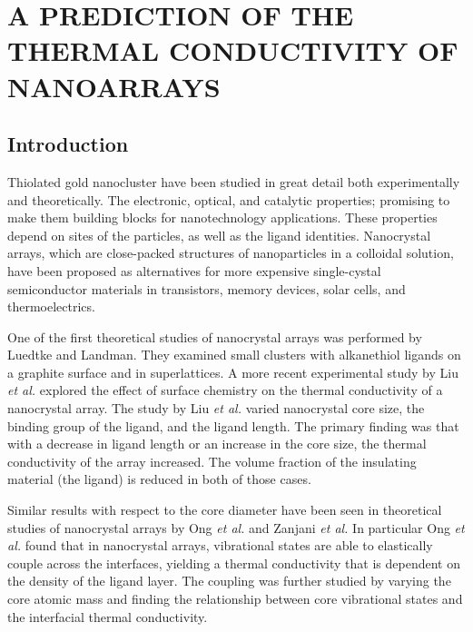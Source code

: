 \chapter{A PREDICTION OF THE THERMAL CONDUCTIVITY OF  NANOARRAYS}\label{chap:arrays}
\section{Introduction}
Thiolated gold nanocluster have been studied in great detail both experimentally and theoretically.\cite{Hakkinen2012, Sardar2009, Jin2010, Tsukuda2012}
The electronic,\cite{Lopez-Acevedo2011,Walter2008} optical,\cite{Cui2014} and catalytic properties;\cite{Chen2013, Lopez-Acevedo2010} promising to make them building blocks for nanotechnology applications.\cite{Dong2011,Podsiadlo2010,Shevchenko2006,Talapin2010}
These properties depend on sites of the particles, as well as the ligand identities.
Nanocrystal arrays, which are close-packed structures of nanoparticles in a colloidal solution, have been proposed as alternatives for more expensive single-cystal semiconductor materials in transistors,\cite{Talapin2005} memory devices,\cite{Sun1999} solar cells,\cite{Tang2011,Gur2005,Ehrler2012} and thermoelectrics.\cite{Ong:2013rt,Kovalenko2010,Wang2008,Ko2011} 

One of the first theoretical studies of nanocrystal arrays was performed by Luedtke and Landman.\cite{Luedtke1996}
They examined small clusters with alkanethiol ligands on a graphite surface and in superlattices. 
A more recent experimental study by Liu \textit{et al.} explored the effect of surface chemistry on the thermal conductivity of a nanocrystal array.\cite{Liu2015}
The study by Liu \textit{et al.} varied nanocrystal core size, the binding group of the ligand, and the ligand length. The primary finding was that with a decrease in ligand length or an increase in the core size, the thermal conductivity of the array increased.
The volume fraction of the insulating material (the ligand) is reduced in both of those cases.

Similar results with respect to the core diameter have been seen in theoretical studies of nanocrystal arrays by Ong \textit{et al.}\cite{Ong:2014yq} and Zanjani \textit{et al.}\cite{Zanjani2014} 
In particular Ong \textit{et al.} found that in nanocrystal arrays, vibrational states are able to elastically couple across the interfaces, yielding a thermal conductivity that is dependent on the density of the ligand layer.\cite{Ong:2014yq} The coupling was further studied by varying the core atomic mass and finding the relationship between core vibrational states and the interfacial thermal conductivity.

